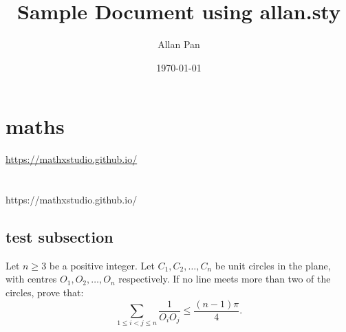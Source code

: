 \documentclass{article}
\title{Sample Document using allan.sty}
\author{Allan Pan}
\date{\today}
\begin{document}
    \maketitle
    \newpage
    \tableofcontents
    \newpage
    \section{maths}
        \url{https://mathxstudio.github.io/} \\
         \\
         \\
        https://mathxstudio.github.io/
        \subsection{test subsection}
        Let \(n\geq 3\) be a positive integer. Let \(C_1,C_2,\ldots,C_n\) be unit circles in the plane, with centres \(O_1,O_2,\ldots,O_n\) respectively. If no line meets more than two of the circles, prove that:
        \[\sum\limits_{1\leq i<j\leq n}\dfrac{1}{O_iO_j}\leq \dfrac{(n-1)\pi}{4}.\]
\end{document}
